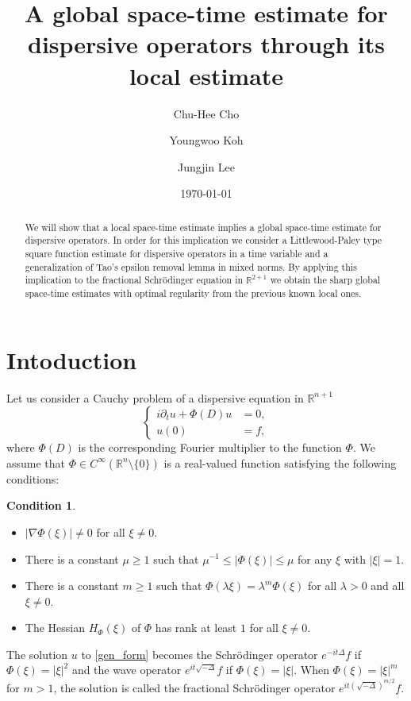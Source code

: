 \documentclass[11pt,reqno]{amsart}
\title[]{A global space-time estimate for dispersive operators through its local estimate}
\author[C.Cho]{Chu-Hee Cho}
\author[Y. Koh]{Youngwoo Koh}
\author[J. Lee]{Jungjin Lee}
\date{\today}
\theoremstyle{plain}
\theoremstyle{definition}
\newtheorem{condition}[thm]{Condition}
\theoremstyle{remark}
\numberwithin{equation}{section}
\begin{document}
\begin{abstract}
We will show that a local space-time estimate implies a global space-time estimate for dispersive operators. In order for this implication we consider a Littlewood-Paley type square function estimate for dispersive operators in a time variable and a generalization of Tao's epsilon removal lemma in mixed norms. By applying this implication to the fractional Schr\"odinger equation in $\mathbb R^{2+1}$ we obtain the sharp global space-time estimates with optimal regularity from the previous known local ones. 
\end{abstract}


\maketitle

\section{Intoduction}
Let us consider a Cauchy problem of a dispersive equation in $\mathbb R^{n+1}$
    \begin{equation} \label{gen_form}
    \left\{
    \begin{aligned}
    i \partial_t u +  \Phi(D)u &= 0,\\ %
    u(0) &= f, %
    \end{aligned}
    \right.
    \end{equation}
where $\Phi(D)$ is the corresponding Fourier multiplier to the function $\Phi$. We assume that $\Phi \in C^\infty(\mathbb R^n \setminus \{0\})$ is a real-valued  function satisfying the following conditions:
\begin{condition} \label{homog_cond} 
{$ $}
\begin{itemize}
\item
$|\nabla \Phi(\xi)| \neq 0$ for all $\xi \neq 0$.
\item
There is a constant $\mu \ge 1$ such that $\mu^{-1} \le |\Phi(\xi)| \le \mu$ for any $\xi$ with $|\xi|=1$.
\item
There is a constant $m \ge 1$ such that $\Phi(\lambda\xi)=\lambda^m\Phi(\xi)$ for all $\lambda>0$ and all $\xi \neq 0$.
\item
The Hessian $H_{\Phi}(\xi)$ of $\Phi$ has rank at least $1$ for all $\xi \neq 0$.
\end{itemize}
\end{condition}
The solution $u$ to \eqref{gen_form} becomes the Schr\"odinger operator $e^{-it\Delta}f$ if $\Phi(\xi)=|\xi|^2$ and the wave operator $e^{it\sqrt{-\Delta}}f$ if $\Phi(\xi)=|\xi|$. When $\Phi(\xi)=|\xi|^m$ for $m>1$, the solution is called the fractional Schr\"odinger operator $e^{it(\sqrt{-\Delta})^{m/2}}f$. 
\end{document}
